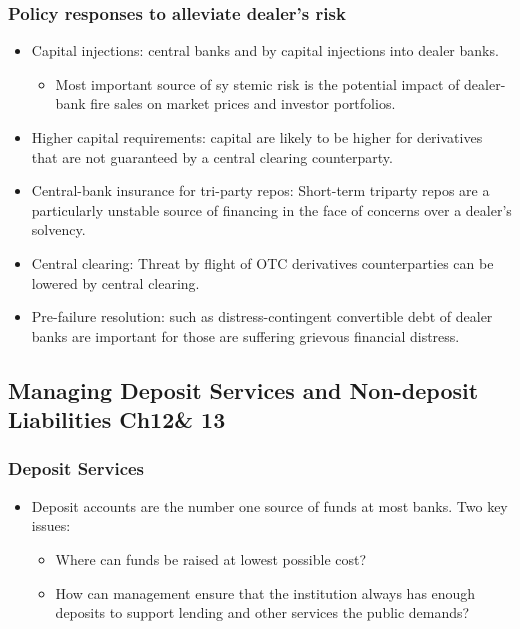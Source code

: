 \subsubsection{Policy responses to alleviate dealer's risk}
\begin{itemize}
\item Capital injections: central banks and by capital injections into dealer banks.
    \begin{itemize}
    \item Most important source of sy stemic risk is the potential impact of dealer-bank fire sales on market prices and investor portfolios.
    \end{itemize}
\item Higher capital requirements: capital are likely to be higher for derivatives that are not guaranteed by a central clearing counterparty.
\item Central-bank insurance for tri-party repos: Short-term triparty repos are a particularly unstable source of financing in the face of concerns over a dealer's solvency.
\item Central clearing: Threat by flight of OTC derivatives counterparties can be lowered by central clearing.
\item Pre-failure resolution: such as distress-contingent convertible debt of dealer banks are important for those are suffering grievous financial distress.
\end{itemize}



\subsection{Managing Deposit Services and Non-deposit Liabilities Ch12\& 13}



\subsubsection{Deposit Services}
\begin{itemize}
\item Deposit accounts are the number one source of funds at most banks. Two key issues:
    \begin{itemize}
    \item Where can funds be raised at lowest possible cost?
    \item How can management ensure that the institution always has enough deposits to support lending and other services the public demands?
    \end{itemize}
    
\end{itemize}



